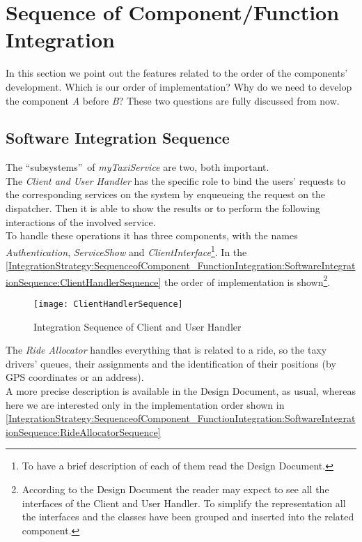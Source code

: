 \documentclass[\mainpath/main]{subfiles}
\begin{document}
\section{Sequence of Component/Function Integration}
\label{IntegrationStrategy:SequenceofComponent_FunctionIntegration}
In this section we point out the features related to the order of the components' development. Which is our order of implementation? Why do we need to develop the component \textit{A} before \textit{B}? These two questions are fully discussed from now.

\subsection{Software Integration Sequence}
\label{IntegrationStrategy:SequenceofComponent_FunctionIntegration:SoftwareIntegrationSequence}
The \textquotedblleft subsystems\textquotedblright\ of \textit{myTaxiService} are two, both important.\\
The \textit{Client and User Handler} has the specific role to bind the users' requests to the corresponding services on the system by enqueueing the request on the dispatcher. Then it is able to show the results or to perform the following interactions of the involved service.\\
To handle these operations it has three components, with the names \textit{Authentication}, \textit{ServiceShow} and \textit{ClientInterface}\footnote{To have a brief description of each of them read the Design Document.}. In the \autoref{IntegrationStrategy:SequenceofComponent_FunctionIntegration:SoftwareIntegrationSequence:ClientHandlerSequence} the order of implementation is shown\footnote{According to the Design Document the reader may expect to see all the interfaces of the Client and User Handler. To simplify the representation all the interfaces and the classes have been grouped and inserted into the related component.}.

\clearpage %

\begin{figure}[h]
	\centering
	\texttt{[image: ClientHandlerSequence]}
	\caption{Integration Sequence of Client and User Handler}
	\label{IntegrationStrategy:SequenceofComponent_FunctionIntegration:SoftwareIntegrationSequence:ClientHandlerSequence}
\end{figure}

The \textit{Ride Allocator} handles everything that is related to a ride, so the taxy drivers' queues, their assignments and the identification of their positions (by GPS coordinates or an address).\\
A more precise description is available in the Design Document, as usual, whereas here we are interested only in the implementation order shown in \autoref{IntegrationStrategy:SequenceofComponent_FunctionIntegration:SoftwareIntegrationSequence:RideAllocatorSequence}
\end{document}
